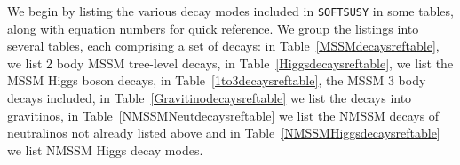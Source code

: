 \documentclass[final,3p,times]{elsarticle}
\begin{document}
\begin{center}
\begin{table}
\caption{MSSM 2 body decays included in the {\tt SOFTSUSY} decay program,
  the references for the formulae in the appendices are given. $\phi$ here is
  $h/H/A$ i.e.\ any of the neutral Higgs bosons. The same references may be
  given for different decays in cases where the underlying formulae are the
  same and the necessary replacements for different outgoing particles are
  given with the formulae.} 
\label{MSSMdecaysreftable}
\end{table}
\end{center}
We begin by listing the various decay modes included in {\tt SOFTSUSY} in some
tables, along with 
equation numbers for quick reference. We group the listings into several
tables, each comprising a set of decays: in Table~\ref{MSSMdecaysreftable}, we
list 2 body MSSM tree-level decays, in Table~\ref{Higgsdecaysreftable}, we
list the MSSM Higgs boson decays, in Table~\ref{1to3decaysreftable}, the MSSM
3 body decays included, in Table~\ref{Gravitinodecaysreftable} we list the
decays into gravitinos, in Table~\ref{NMSSMNeutdecaysreftable} we list the
NMSSM decays of neutralinos not already listed above and in
Table~\ref{NMSSMHiggsdecaysreftable} we list NMSSM Higgs decay modes. 
\end{document}
